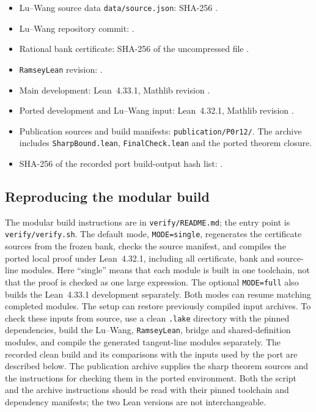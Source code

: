 \documentclass[11pt]{article}
\theoremstyle{definition}
\theoremstyle{remark}
\newcommand{\lean}[1]{\nolinkurl{#1}}
\begin{document}
{\sloppy
\begin{itemize}[leftmargin=*,itemsep=2pt]
\small
\item Lu--Wang source data \lean{data/source.json}: SHA-256
\texttt{}.
\item Lu--Wang repository commit: \texttt{}.
\item Rational bank certificate: SHA-256 of the uncompressed file
\texttt{}.
\item \texttt{RamseyLean} revision:
\texttt{}.
\item Main development: Lean~4.33.1, Mathlib revision
\texttt{}.
\item Ported development and Lu--Wang input: Lean~4.32.1, Mathlib revision
\texttt{}.
\item Publication sources and build manifests: \lean{publication/P0r12/}.
The archive includes \lean{SharpBound.lean}, \lean{FinalCheck.lean} and the ported theorem closure.
\item SHA-256 of the recorded port build-output hash list:
\texttt{}.
\end{itemize}
\par}

\subsection{Reproducing the modular build}

The modular build instructions are in \lean{verify/README.md}; the entry point is
\lean{verify/verify.sh}. The default mode, \lean{MODE=single}, regenerates the certificate sources from the frozen
bank, checks the source manifest, and compiles the ported local proof under Lean~4.32.1, including all certificate,
bank and source-line modules. Here ``single'' means that each module is built in one toolchain,
not that the proof is checked as one large expression. The optional \lean{MODE=full} also builds the
Lean~4.33.1 development separately. Both modes can resume matching completed modules.
The setup can restore previously compiled input archives. To check these inputs from source, use a clean
\texttt{.lake} directory with the pinned dependencies, build the Lu--Wang, \texttt{RamseyLean}, bridge and
shared-definition modules, and compile the generated tangent-line modules separately.
The recorded clean build and its comparisons with the inputs used by the port are described below.
The publication archive supplies the sharp theorem sources and the instructions for checking them in the
ported environment. Both the script and the archive instructions should be read with their pinned toolchain
and dependency manifests; the two Lean versions are not interchangeable.
\end{document}
